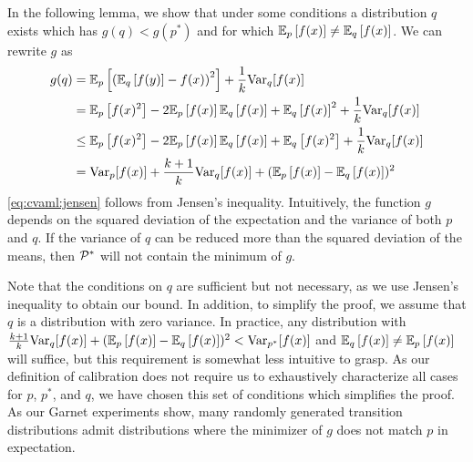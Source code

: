In the following lemma, we show that under some conditions a distribution $q$ exists which has $g(q) < g(p^*)$ and for which $\EEX{p}{f(x)} \neq \EEX{q}{f(x)}$.
We can rewrite $g$ as
\begin{align}
    g(q) &=\EEX{p}{\left(\EEX{q}{f(y)} - f(x)\right)^2} + \frac{1}{k}\mathrm{Var}_q[f(x)] \\
    &= \EEX{p}{f(x)^2} - 2\EEX{p}{f(x)}\EEX{q}{f(x)} + \EEX{q}{f(x)}^2 + \frac{1}{k}\mathrm{Var}_q[f(x)]\\
    & \leq \EEX{p}{f(x)^2} - 2\EEX{p}{f(x)}\EEX{q}{f(x)} + \EEX{q}{f(x)^2}  + \frac{1}{k}\mathrm{Var}_q[f(x)]\label{eq:cvaml:jensen}\\
    & = \mathrm{Var}_p[f(x)] + \frac{k + 1}{k}\mathrm{Var}_q[f(x)] + (\EEX{p}{f(x)} - \EEX{q}{f(x)})^2
\end{align}
\autoref{eq:cvaml:jensen} follows from Jensen's inequality.
Intuitively, the function $g$ depends on the squared deviation of the expectation and the variance of both $p$ and $q$.
If the variance of $q$ can be reduced more than the squared deviation of the means, then $\P^*$ will not contain the minimum of $g$.

Note that the conditions on $q$ are sufficient but not necessary, as we use Jensen's inequality to obtain our bound.
In addition, to simplify the proof, we assume that $q$ is a distribution with zero variance.
In practice, any distribution with $\frac{k + 1}{k}\mathrm{Var}_q[f(x)] + (\EEX{p}{f(x)} - \EEX{q}{f(x)})^2 < \mathrm{Var}_{p^*}[f(x)]$ and $\EEX{q}{f(x)} \not = \EEX{p}{f(x)}$ will suffice, but this requirement is somewhat less intuitive to grasp.
As our definition of calibration does not require us to exhaustively characterize all cases for $p$, $p^*$, and $q$, we have chosen this set of conditions which simplifies the proof. 
As our Garnet experiments show, many randomly generated transition distributions admit distributions where the minimizer of $g$ does not match $p$ in expectation.

